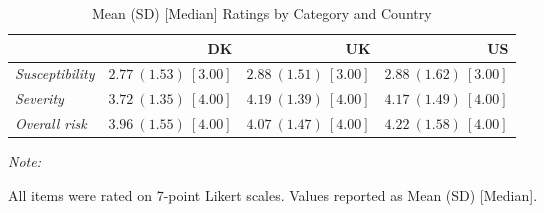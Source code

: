 \begin{table}[H]
\centering
\caption{Mean (SD) [Median] Ratings by Category and Country}
\label{table:health_descriptives}
\centering
\begin{threeparttable}
\begin{tabular}[t]{>{}lrrr}
\toprule
 & DK & UK & US\\
\midrule
\em{Susceptibility} & $2.77\ (1.53)\ [3.00]$ & $2.88\ (1.51)\ [3.00]$ & $2.88\ (1.62)\ [3.00]$\\
\em{Severity} & $3.72\ (1.35)\ [4.00]$ & $4.19\ (1.39)\ [4.00]$ & $4.17\ (1.49)\ [4.00]$\\
\em{Overall risk} & $3.96\ (1.55)\ [4.00]$ & $4.07\ (1.47)\ [4.00]$ & $4.22\ (1.58)\ [4.00]$\\
\bottomrule
\end{tabular}
\begin{tablenotes}
\item \textit{Note: } 
\item All items were rated on 7-point Likert scales. Values reported as Mean (SD) [Median].
\end{tablenotes}
\end{threeparttable}
\end{table}
